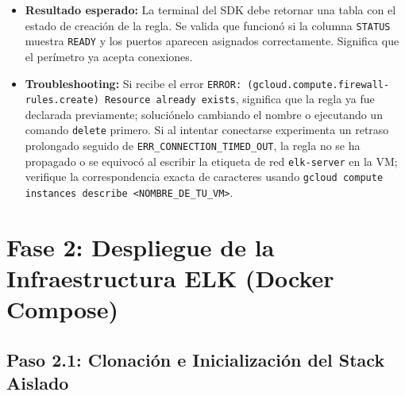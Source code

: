 \documentclass[
  coursetitle={Cómputo Nube y Tecnologías Emergentes},
  coursehours={96},
  coursedate={Verano 2026},
  doctype={Práctica},
  otherlangs={english,french},
  authorname={Lázaro},
  authorsurname={Bustio-Martínez},
  authortitle={PhD},
  role={Profesor Investigador},
  email={lbustio@inaoe.mx},
  phone={5559504000},
  ext={7459},
  institution={Instituto Nacional de Astrofísica, Óptica y Electrónica (INAOE)},
  department={Maestría en Ciencias en Tecnologías de Seguridad},
  address={Luis Enrique Erro 1, Sta. Ma. Tonantzintla, San Andrés Cholula, CP 72840, Puebla, México},
  margin={0.5in}
]{../../lbustio_lecture_notes}
\begin{document}
\begin{itemize}
    \item \textbf{Resultado esperado:} La terminal del SDK debe retornar una tabla con el estado de creación de la regla. Se valida que funcionó si la columna \texttt{STATUS} muestra \texttt{READY} y los puertos aparecen asignados correctamente. Significa que el perímetro ya acepta conexiones.
    
    \item \textbf{Troubleshooting:} Si recibe el error \texttt{ERROR: (gcloud.compute.firewall-rules.create) Resource already exists}, significa que la regla ya fue declarada previamente; soluciónelo cambiando el nombre o ejecutando un comando \texttt{delete} primero. Si al intentar conectarse experimenta un retraso prolongado seguido de \texttt{ERR\_CONNECTION\_TIMED\_OUT}, la regla no se ha propagado o se equivocó al escribir la etiqueta de red \texttt{elk-server} en la VM; verifique la correspondencia exacta de caracteres usando \texttt{gcloud compute instances describe <NOMBRE\_DE\_TU\_VM>}.
\end{itemize}

\section{Fase 2: Despliegue de la Infraestructura ELK (Docker Compose)}

\subsection{Paso 2.1: Clonación e Inicialización del Stack Aislado}
\end{document}
